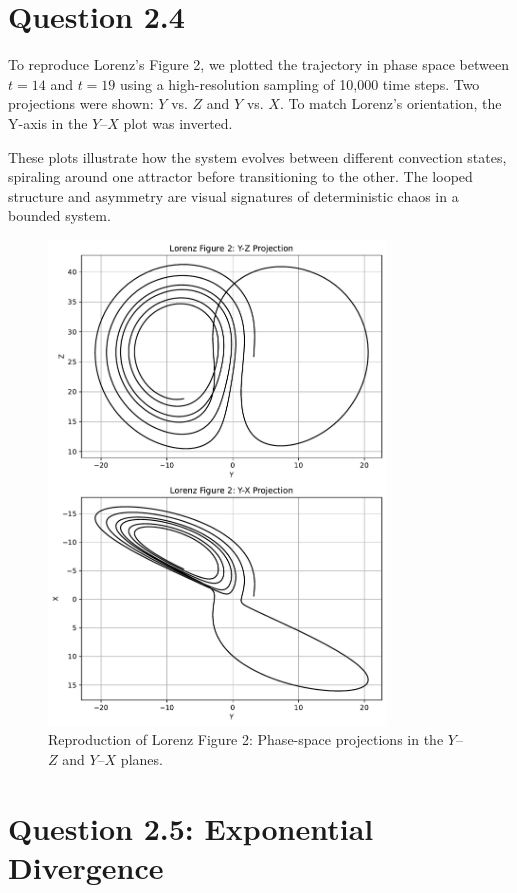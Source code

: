 \documentclass[11pt]{article}
\begin{document}
\section*{Question 2.4}

To reproduce Lorenz’s Figure 2, we plotted the trajectory in phase space between $t = 14$ and $t = 19$ using a high-resolution sampling of 10,000 time steps. Two projections were shown: $Y$ vs. $Z$ and $Y$ vs. $X$. To match Lorenz’s orientation, the Y-axis in the $Y$–$X$ plot was inverted.

These plots illustrate how the system evolves between different convection states, spiraling around one attractor before transitioning to the other. The looped structure and asymmetry are visual signatures of deterministic chaos in a bounded system.


\begin{figure}[H]
    \centering
    \includegraphics[width=0.8\textwidth]{fig2d.pdf}
    \caption{Reproduction of Lorenz Figure 2: Phase-space projections in the $Y$–$Z$ and $Y$–$X$ planes.}
\end{figure}
\newpage

\section*{Question 2.5: Exponential Divergence}
\end{document}
